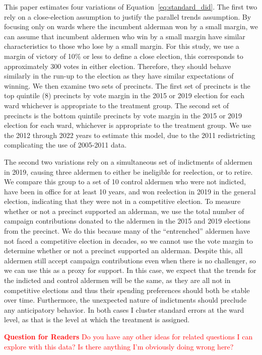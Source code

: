 This paper estimates four variations of Equation~\ref{eq:standard_did}. 
The first two rely on a close-election assumption to justify the parallel trends assumption. 
By focusing only on wards where the incumbent alderman won by a small margin, we can assume that incumbent aldermen who win by a small margin have similar characteristics to those who lose by a small margin.
For this study, we use a margin of victory of 10\% or less to define a close election, this corresponds to approximately 300 votes in either election.
Therefore, they should behave similarly in the run-up to the election as they have similar expectations of winning.
We then examine two sets of precincts. 
The first set of precincts is the top quintile (8) precincts by vote margin in the 2015 or 2019 election for each ward whichever is appropriate to the treatment group. 
The second set of precincts is the bottom quintile precincts by vote margin in the 2015 or 2019 election for each ward, whichever is appropriate to the treatment group.
We use the 2012 through 2022 years to estimate this model, due to the 2011 redistricting complicating the use of 2005-2011 data. 

The second two variations rely on a simultaneous set of indictments of aldermen in 2019, causing three aldermen to either be ineligible for reelection, or to retire. 
We compare this group to a set of 10 control aldermen who were not indicted, have been in office for at least 10 years, and won reelection in 2019 in the general election, indicating that they were not in a competitive election. 
To measure whether or not a precinct supported an alderman, we use the total number of campaign contributions donated to the aldermen in the 2015 and 2019 elections from the precinct.
We do this because many of the ``entrenched'' aldermen have not faced a competitive election in decades, so we cannot use the vote margin to determine whether or not a precinct supported an alderman.
Despite this, all aldermen still accept campaign contributions even when there is no challenger, so we can use this as a proxy for support.
In this case, we expect that the trends for the indicted and control aldermen will be the same, as they are all not in competitive elections and thus their spending preferences should both be stable over time.
Furthermore, the unexpected nature of indictments should preclude any anticipatory behavior.
In both cases I cluster standard errors at the ward level, as that is the level at which the treatment is assigned.

\textcolor{red}{\textbf{Question for Readers} Do you have any other ideas for related questions I can explore with this data? Is there anything I'm obviously doing wrong here?}
